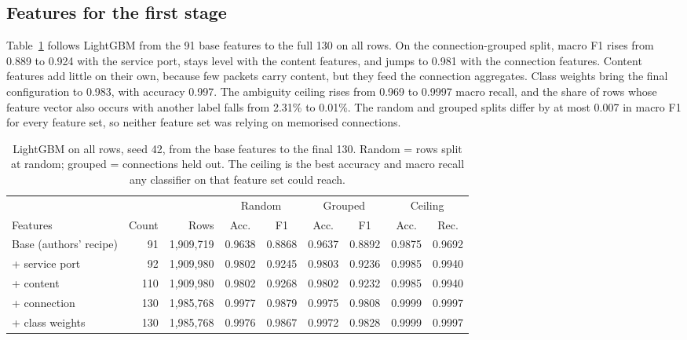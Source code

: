 \subsection{Features for the first stage}
\label{sec:featstudy}
Table~\ref{tab:feat} follows LightGBM from the 91 base features to the full 130 on all rows. On the connection-grouped split, macro F1 rises from 0.889 to 0.924 with the service port, stays level with the content features, and jumps to 0.981 with the connection features. Content features add little on their own, because few packets carry content, but they feed the connection aggregates. Class weights bring the final configuration to 0.983, with accuracy 0.997. The ambiguity ceiling rises from 0.969 to 0.9997 macro recall, and the share of rows whose feature vector also occurs with another label falls from 2.31\% to 0.01\%. The random and grouped splits differ by at most 0.007 in macro F1 for every feature set, so neither feature set was relying on memorised connections.

\begin{table}[t]
\centering
\caption{LightGBM on all rows, seed 42, from the base features to the final 130. Random = rows split at random; grouped = connections held out. The ceiling is the best accuracy and macro recall any classifier on that feature set could reach.}
\label{tab:feat}
\small
\setlength{\tabcolsep}{2.5pt}
\begin{adjustbox}{max width=\linewidth}
\begin{tabular}{lrrcccccc}
\toprule
 & & & \multicolumn{2}{c}{Random} & \multicolumn{2}{c}{Grouped} & \multicolumn{2}{c}{Ceiling} \\
\cmidrule(lr){4-5}\cmidrule(lr){6-7}\cmidrule(lr){8-9}
Features & Count & Rows & Acc. & F1 & Acc. & F1 & Acc. & Rec. \\
\midrule
Base (authors' recipe) & 91 & 1,909,719 & 0.9638 & 0.8868 & 0.9637 & 0.8892 & 0.9875 & 0.9692 \\
+ service port & 92 & 1,909,980 & 0.9802 & 0.9245 & 0.9803 & 0.9236 & 0.9985 & 0.9940 \\
+ content & 110 & 1,909,980 & 0.9802 & 0.9268 & 0.9802 & 0.9232 & 0.9985 & 0.9940 \\
+ connection & 130 & 1,985,768 & 0.9977 & 0.9879 & 0.9975 & 0.9808 & 0.9999 & 0.9997 \\
+ class weights & 130 & 1,985,768 & 0.9976 & 0.9867 & 0.9972 & 0.9828 & 0.9999 & 0.9997 \\
\bottomrule
\end{tabular}
\end{adjustbox}
\end{table}

